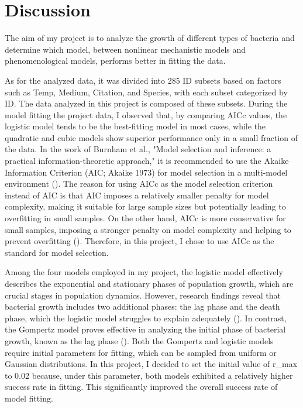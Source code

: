 \documentclass[11pt]{article}
\begin{document}
\section{Discussion}
The aim of my project is to analyze the growth of different types of bacteria and determine which model, between nonlinear mechanistic models and phenomenological models, performs better in fitting the data.\par
As for the analyzed data, it was divided into 285 ID subsets based on factors such as Temp, Medium, Citation, and Species, with each subset categorized by ID. The data analyzed in this project is composed of these subsets. During the model fitting the project data, I observed that, by comparing AICc values, the logistic model tends to be the best-fitting model in most cases, while the quadratic and cubic models show superior performance only in a small fraction of the data. In the work of Burnham et al., "Model selection and inference: a practical information-theoretic approach," it is recommended to use the Akaike Information Criterion (AIC; Akaike 1973) for model selection in a multi-model environment (\cite{burnham_2002}). The reason for using AICc as the model selection criterion instead of AIC is that AIC imposes a relatively smaller penalty for model complexity, making it suitable for large sample sizes but potentially leading to overfitting in small samples. On the other hand, AICc is more conservative for small samples, imposing a stronger penalty on model complexity and helping to prevent overfitting (\cite{johnson_2004}). Therefore, in this project, I chose to use AICc as the standard for model selection.\par
Among the four models employed in my project, the logistic model effectively describes the exponential and stationary phases of population growth, which are crucial stages in population dynamics. However, research findings reveal that bacterial growth includes two additional phases: the lag phase and the death phase, which the logistic model struggles to explain adequately (\cite{maier_book_2015}). In contrast, the Gompertz model proves effective in analyzing the initial phase of bacterial growth, known as the lag phase (\cite{peleg_2011}). Both the Gompertz and logistic models require initial parameters for fitting, which can be sampled from uniform or Gaussian distributions. In this project, I decided to set the initial value of r\_{max} to 0.02 because, under this parameter, both models exhibited a relatively higher success rate in fitting. This significantly improved the overall success rate of model fitting. \par
\end{document}
